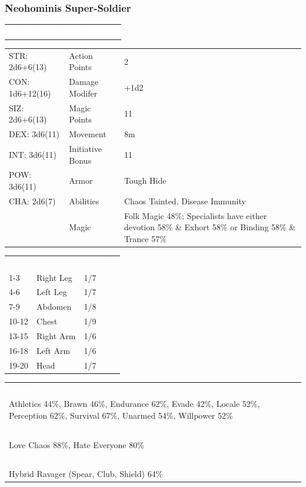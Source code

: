 \documentclass[letterpaper,serif]{rpg-module}
\begin{document}
\subsubsection{Neohominis Super-Soldier}

\lipsum[1]

\vspace{12pt}

\noindent\begin{tabularx}{\linewidth}{X}
\rowcolor{gray}
\textcolor{white}{\textbf{Neohominis Super-Soldier}}
\end{tabularx}

\begin{tabularx}{\linewidth}{XXX}
STR: 2d6+6(13) & Action Points & 2 \\
CON: 1d6+12(16) & Damage Modifer & +1d2 \\
SIZ: 2d6+6(13) & Magic Points & 11 \\
DEX: 3d6(11) & Movement & 8m \\
INT: 3d6(11) & Initiative Bonus & 11 \\
POW: 3d6(11) & Armor & Tough Hide \\
CHA: 2d6(7) & Abilities & Chaos Tainted, Disease Immunity \\
    & Magic & Folk Magic 48\%; Specialists have either devotion 58\% \& Exhort 58\% or Binding 58\% \& Trance 57\%
\end{tabularx}

\begin{tabularx}{\linewidth}{XXX}
\rowcolor{gray}
\textcolor{white}{\textbf{1d20}} & \textcolor{white}{\textbf{Location}} & \textcolor{white}{\textbf{AP/HP}} \\
1-3 & Right Leg & 1/7 \\
4-6 & Left Leg & 1/7 \\
7-9 & Abdomen & 1/8 \\
10-12 & Chest & 1/9 \\
13-15 & Right Arm & 1/6 \\
16-18 & Left Arm & 1/6 \\
19-20 & Head & 1/7 
\end{tabularx}

\begin{tabularx}{\linewidth}{X}
\rowcolor{gray}
\textcolor{white}{\textbf{Skills}} \\
Athletics 44\%, Brawn 46\%, Endurance 62\%, Evade 42\%, Locale 52\%, Perception 62\%, Survival 67\%, Unarmed 54\%, Willpower 52\%\\
\rowcolor{gray}
\textcolor{white}{\textbf{Passions}} \\
Love Chaos 88\%, Hate Everyone 80\% \\
\rowcolor{gray}
\textcolor{white}{\textbf{Combat Styles \& Weapons}} \\
Hybrid Ravager (Spear, Club, Shield) 64\%
\end{tabularx}
\end{document}
